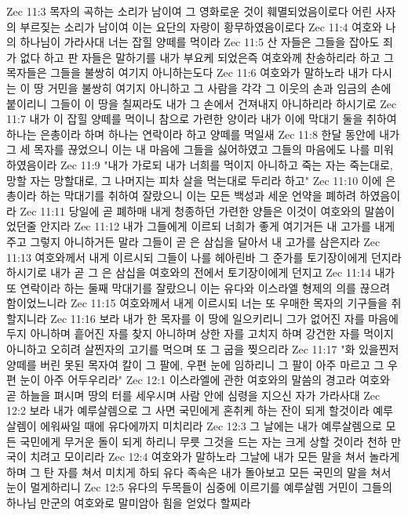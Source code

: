 Zec 11:3  목자의 곡하는 소리가 남이여 그 영화로운 것이 훼멸되었음이로다 어린 사자의 부르짖는 소리가 남이여 이는 요단의 자랑이 황무하였음이로다
Zec 11:4  여호와 나의 하나님이 가라사대 너는 잡힐 양떼를 먹이라
Zec 11:5  산 자들은 그들을 잡아도 죄가 없다 하고 판 자들은 말하기를 내가 부요케 되었은즉 여호와께 찬송하리라 하고 그 목자들은 그들을 불쌍히 여기지 아니하는도다
Zec 11:6  여호와가 말하노라 내가 다시는 이 땅 거민을 불쌍히 여기지 아니하고 그 사람을 각각 그 이웃의 손과 임금의 손에 붙이리니 그들이 이 땅을 칠찌라도 내가 그 손에서 건져내지 아니하리라 하시기로
Zec 11:7  내가 이 잡힐 양떼를 먹이니 참으로 가련한 양이라 내가 이에 막대기 둘을 취하여 하나는 은총이라 하며 하나는 연락이라 하고 양떼를 먹일새
Zec 11:8  한달 동안에 내가 그 세 목자를 끊었으니 이는 내 마음에 그들을 싫어하였고 그들의 마음에도 나를 미워하였음이라
Zec 11:9  "내가 가로되 내가 너희를 먹이지 아니하고 죽는 자는 죽는대로, 망할 자는 망할대로, 그 나머지는 피차 살을 먹는대로 두리라 하고"
Zec 11:10  이에 은총이라 하는 막대기를 취하여 잘랐으니 이는 모든 백성과 세운 언약을 폐하려 하였음이라
Zec 11:11  당일에 곧 폐하매 내게 청종하던 가련한 양들은 이것이 여호와의 말씀이었던줄 안지라
Zec 11:12  내가 그들에게 이르되 너희가 좋게 여기거든 내 고가를 내게 주고 그렇지 아니하거든 말라 그들이 곧 은 삼십을 달아서 내 고가를 삼은지라
Zec 11:13  여호와께서 내게 이르시되 그들이 나를 헤아린바 그 준가를 토기장이에게 던지라 하시기로 내가 곧 그 은 삼십을 여호와의 전에서 토기장이에게 던지고
Zec 11:14  내가 또 연락이라 하는 둘째 막대기를 잘랐으니 이는 유다와 이스라엘 형제의 의를 끊으려 함이었느니라
Zec 11:15  여호와께서 내게 이르시되 너는 또 우매한 목자의 기구들을 취할지니라
Zec 11:16  보라 내가 한 목자를 이 땅에 일으키리니 그가 없어진 자를 마음에 두지 아니하며 흩어진 자를 찾지 아니하며 상한 자를 고치지 하며 강건한 자를 먹이지 아니하고 오히려 살찐자의 고기를 먹으며 또 그 굽을 찢으리라
Zec 11:17  "화 있을찐저 양떼를 버린 못된 목자여 칼이 그 팔에, 우편 눈에 임하리니 그 팔이 아주 마르고 그 우편 눈이 아주 어두우리라"
Zec 12:1  이스라엘에 관한 여호와의 말씀의 경고라 여호와 곧 하늘을 펴시며 땅의 터를 세우시며 사람 안에 심령을 지으신 자가 가라사대
Zec 12:2  보라 내가 예루살렘으로 그 사면 국민에게 혼취케 하는 잔이 되게 할것이라 예루살렘이 에워싸일 때에 유다에까지 미치리라
Zec 12:3  그 날에는 내가 예루살렘으로 모든 국민에게 무거운 돌이 되게 하리니 무릇 그것을 드는 자는 크게 상할 것이라 천하 만국이 치려고 모이리라
Zec 12:4  여호와가 말하노라 그날에 내가 모든 말을 쳐서 놀라게 하며 그 탄 자를 쳐서 미치게 하되 유다 족속은 내가 돌아보고 모든 국민의 말을 쳐서 눈이 멀게하리니
Zec 12:5  유다의 두목들이 심중에 이르기를 예루살렘 거민이 그들의 하나님 만군의 여호와로 말미암아 힘을 얻었다 할찌라
